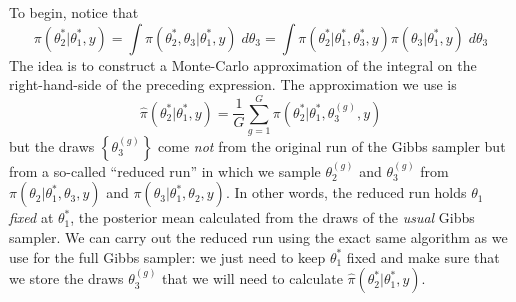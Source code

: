 \documentclass[12pt]{article}
\begin{document}
To begin, notice that
\begin{equation*}
  \pi\left( \theta^*_2|\theta^*_1, y \right) = \int \pi(\theta^*_2, \theta_3|\theta_1^*,y) \; d\theta_3 = \int \pi(\theta_2^*|\theta^*_1, \theta^*_3,y)\pi(\theta_3|\theta^*_1,y) \; d\theta_3
\end{equation*}
The idea is to construct a Monte-Carlo approximation of the integral on the right-hand-side of the preceding expression.
The approximation we use is
\begin{equation*}
  \hat{\pi}\left( \theta_2^*|\theta^*_1,y \right) = \frac{1}{G} \sum_{g = 1}^G \pi(\theta_2^*|\theta_1^*, \theta_3^{(g)},y)
\end{equation*}
but the draws $\left\{ \theta_3^{(g)} \right\}$ come \emph{not} from the original run of the Gibbs sampler but from a so-called ``reduced run'' in which we sample $\theta_2^{(g)}$ and $\theta_3^{(g)}$ from $\pi(\theta_2|\theta_1^*,\theta_3, y)$ and $\pi(\theta_3|\theta_1^*,\theta_2,y)$.
In other words, the reduced run holds $\theta_1$ \emph{fixed} at $\theta^*_1$, the posterior mean calculated from the draws of the \emph{usual} Gibbs sampler.
We can carry out the reduced run using the exact same algorithm as we use for the full Gibbs sampler: we just need to keep $\theta^*_1$ fixed and make sure that we store the draws $\theta_3^{(g)}$ that we will need to calculate $\hat{\pi}(\theta^*_2|\theta_1^*,y)$.
\end{document}

